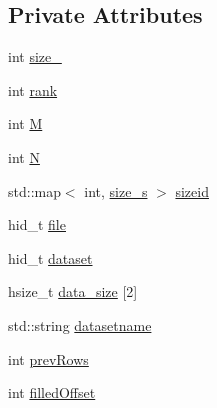 \subsection*{Private Attributes}
\begin{DoxyCompactItemize}
\item 
int \hyperlink{classHDF_a4b0ee3e98c89b373052525bb5abd8fae}{size\-\_\-}
\item 
int \hyperlink{classHDF_ad8673b6d5dacddd59fcb8c10682160f7}{rank}
\item 
int \hyperlink{classHDF_aee1593ceda7b33a941e52e9f6e998f51}{M}
\item 
int \hyperlink{classHDF_ab3b5c9aa5d584ac3aa16ee9c6d04c340}{N}
\item 
std\-::map$<$ int, \hyperlink{structHDF_1_1size__s}{size\-\_\-s} $>$ \hyperlink{classHDF_ab47d2b1f7a374429d26ec54f15f4cea5}{sizeid}
\item 
hid\-\_\-t \hyperlink{classHDF_ab7e91e3f89c7fb189e0b0d9705d2f569}{file}
\item 
hid\-\_\-t \hyperlink{classHDF_adc37f93332228a0d29d1d0b8f7021b0c}{dataset}
\item 
hsize\-\_\-t \hyperlink{classHDF_a5fcc08146bef981eb0c865e01f8578a3}{data\-\_\-size} \mbox{[}2\mbox{]}
\item 
std\-::string \hyperlink{classHDF_a9b95020b5a2be0e7d2930c1221df9aa4}{datasetname}
\item 
int \hyperlink{classHDF_a9a4c71b47bab1ce6053362848828e8b0}{prev\-Rows}
\item 
int \hyperlink{classHDF_afcedff6f9548bada3d9ad4121bff726e}{filled\-Offset}
\end{DoxyCompactItemize}


